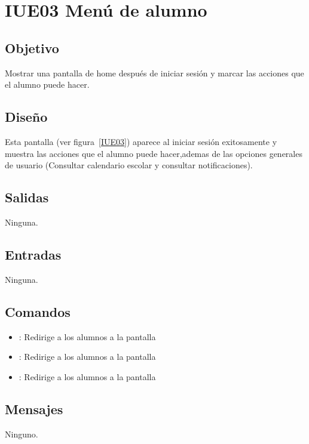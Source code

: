 \section{IUE03 Menú de alumno}

\subsection{Objetivo}
Mostrar una pantalla de home después de iniciar sesión y marcar las acciones que el alumno puede hacer.

\subsection{Diseño}
Esta pantalla  (ver figura~\ref{IUE03}) aparece al iniciar sesión exitosamente y muestra las acciones que el alumno puede hacer,ademas de las opciones generales de usuario (Consultar calendario escolar y consultar notificaciones). 


\subsection{Salidas}

Ninguna.

\subsection{Entradas}
Ninguna.

\subsection{Comandos}
\begin{itemize}
	\item {}: Redirige a los alumnos a la pantalla 
	\item {}: Redirige a los alumnos a la pantalla 
	\item {}: Redirige a los alumnos a la pantalla 
	
\end{itemize}

\subsection{Mensajes}

\begin{Citemize}
	\item Ninguno.
\end{Citemize}

